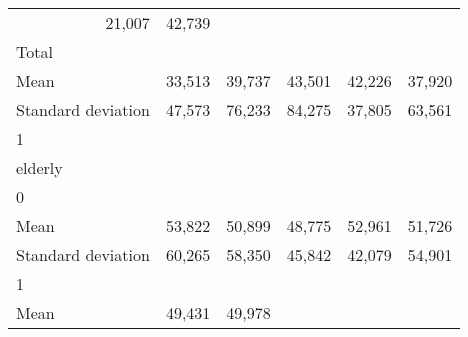 \begin{tabular}{llllll}
  \multicolumn{1}{r}{21,007} &
  \multicolumn{1}{r}{42,739} \\
\multicolumn{1}{l}{\hspace{3em}Total} &
  \multicolumn{1}{|r}{} &
  \multicolumn{1}{r}{} &
  \multicolumn{1}{r}{} &
  \multicolumn{1}{r}{} &
  \multicolumn{1}{r}{} \\
\multicolumn{1}{l}{\hspace{4em}Mean} &
  \multicolumn{1}{|r}{33,513} &
  \multicolumn{1}{r}{39,737} &
  \multicolumn{1}{r}{43,501} &
  \multicolumn{1}{r}{42,226} &
  \multicolumn{1}{r}{37,920} \\
\multicolumn{1}{l}{\hspace{4em}Standard deviation} &
  \multicolumn{1}{|r}{47,573} &
  \multicolumn{1}{r}{76,233} &
  \multicolumn{1}{r}{84,275} &
  \multicolumn{1}{r}{37,805} &
  \multicolumn{1}{r}{63,561} \\
\multicolumn{1}{l}{\hspace{1em}1} &
  \multicolumn{1}{|r}{} &
  \multicolumn{1}{r}{} &
  \multicolumn{1}{r}{} &
  \multicolumn{1}{r}{} &
  \multicolumn{1}{r}{} \\
\multicolumn{1}{l}{\hspace{2em}elderly} &
  \multicolumn{1}{|r}{} &
  \multicolumn{1}{r}{} &
  \multicolumn{1}{r}{} &
  \multicolumn{1}{r}{} &
  \multicolumn{1}{r}{} \\
\multicolumn{1}{l}{\hspace{3em}0} &
  \multicolumn{1}{|r}{} &
  \multicolumn{1}{r}{} &
  \multicolumn{1}{r}{} &
  \multicolumn{1}{r}{} &
  \multicolumn{1}{r}{} \\
\multicolumn{1}{l}{\hspace{4em}Mean} &
  \multicolumn{1}{|r}{53,822} &
  \multicolumn{1}{r}{50,899} &
  \multicolumn{1}{r}{48,775} &
  \multicolumn{1}{r}{52,961} &
  \multicolumn{1}{r}{51,726} \\
\multicolumn{1}{l}{\hspace{4em}Standard deviation} &
  \multicolumn{1}{|r}{60,265} &
  \multicolumn{1}{r}{58,350} &
  \multicolumn{1}{r}{45,842} &
  \multicolumn{1}{r}{42,079} &
  \multicolumn{1}{r}{54,901} \\
\multicolumn{1}{l}{\hspace{3em}1} &
  \multicolumn{1}{|r}{} &
  \multicolumn{1}{r}{} &
  \multicolumn{1}{r}{} &
  \multicolumn{1}{r}{} &
  \multicolumn{1}{r}{} \\
\multicolumn{1}{l}{\hspace{4em}Mean} &
  \multicolumn{1}{|r}{49,431} &
  \multicolumn{1}{r}{49,978} &

\end{tabular}
